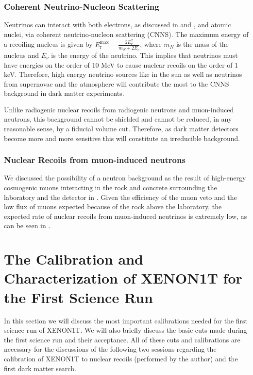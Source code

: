 \subsubsection{Coherent Neutrino-Nucleon Scattering}

Neutrinos can interact with both electrons, as discussed in  and , and atomic nuclei, via coherent neutrino-nucleon scattering (CNNS).  The maximum energy of a recoiling nucleus is given by $E_{\textrm{r}}^{\textrm{max}} = \frac{2 E_{\nu}^2}{m_N + 2 E_{\nu}}$, where $m_N$ is the mass of the nucleus and $E_{\nu}$ is the energy of the neutrino.  This implies that neutrinos must have energies on the order of 10 MeV to cause nuclear recoils on the order of 1 keV.  Therefore, high energy neutrino sources like  in the sun as well as neutrinos from supernovae and the atmosphere will contribute the most to the CNNS background in dark matter experiments.

Unlike radiogenic nuclear recoils from radiogenic neutrons and muon-induced neutrons, this background cannot be shielded and cannot be reduced, in any reasonable sense, by a fiducial volume cut.  Therefore, as dark matter detectors become more and more sensitive this will constitute an irreducible background.

\subsubsection{Nuclear Recoils from muon-induced neutrons}

We discussed the possibility of a neutron background as the result of high-energy cosmogenic muons interacting in the rock and concrete surrounding the laboratory and the detector in .  Given the efficiency of the muon veto and the low flux of muons expected because of the rock above the laboratory, the expected rate of nuclear recoils from muon-induced neutrinos is extremely low, as can be seen in .



\section{The Calibration and Characterization of XENON1T for the First Science Run}
\label{sec:xe1t_calibrations}

In this section we will discuss the most important calibrations needed for the first science run of XENON1T.  We will also briefly discuss the basic cuts made during the first science run and their acceptance.  All of these cuts and calibrations are necessary for the discussions of the following two sessions regarding the calibration of XENON1T to nuclear recoils (performed by the author) and the first dark matter search.


